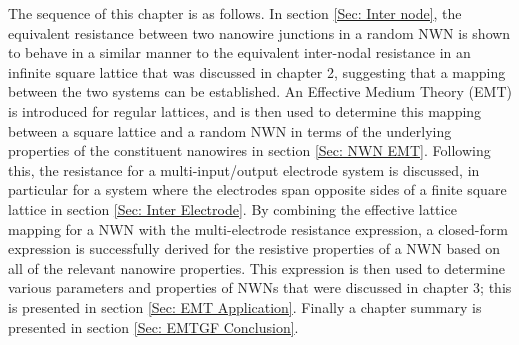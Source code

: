 The sequence of this chapter is as follows. In section \ref{Sec: Inter node}, the equivalent resistance between two nanowire junctions in a random NWN is shown to behave in a similar manner to the equivalent inter-nodal resistance in an infinite square lattice that was discussed in chapter 2, suggesting that a mapping between the two systems can be established. An Effective Medium Theory (EMT) is introduced for regular lattices, and is then used to determine this mapping between a square lattice and a random NWN in terms of the underlying properties of the constituent nanowires in section \ref{Sec: NWN EMT}. Following this, the resistance for a multi-input/output electrode system is discussed, in particular for a system where the electrodes span opposite sides of a finite square lattice in section \ref{Sec: Inter Electrode}. By combining the effective lattice mapping for a NWN with the multi-electrode resistance expression, a closed-form expression is successfully derived for the resistive properties of a NWN based on all of the relevant nanowire properties. This expression is then used to determine various parameters and properties of NWNs that were discussed in chapter 3; this is presented in section \ref{Sec: EMT Application}. Finally a chapter summary is presented in section \ref{Sec: EMTGF Conclusion}. 

